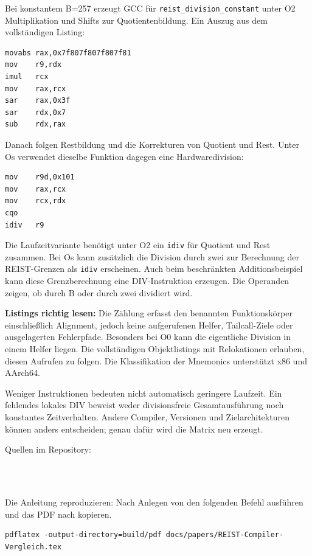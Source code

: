 \documentclass[11pt,a4paper]{article}
\begin{document}
Bei konstantem B=257 erzeugt GCC für \texttt{reist\_division\_constant} unter
O2 Multiplikation und Shifts zur Quotientenbildung. Ein Auszug aus dem
vollständigen Listing:
\begin{lstlisting}
movabs rax,0x7f807f807f807f81
mov    r9,rdx
imul   rcx
mov    rax,rcx
sar    rax,0x3f
sar    rdx,0x7
sub    rdx,rax
\end{lstlisting}
Danach folgen Restbildung und die Korrekturen von Quotient und Rest.
Unter Os verwendet dieselbe Funktion dagegen eine Hardwaredivision:
\begin{lstlisting}
mov    r9d,0x101
mov    rax,rcx
mov    rcx,rdx
cqo
idiv   r9
\end{lstlisting}
Die Laufzeitvariante benötigt unter O2 ein \texttt{idiv} für Quotient und Rest
zusammen. Bei Os kann zusätzlich die Division durch zwei zur Berechnung der
REIST-Grenzen als \texttt{idiv} erscheinen. Auch beim beschränkten
Additionsbeispiel kann diese Grenzberechnung eine DIV-Instruktion erzeugen.
Die Operanden zeigen, ob durch B oder durch zwei dividiert wird.

\textbf{Listings richtig lesen:}
Die Zählung erfasst den benannten Funktionskörper einschließlich Alignment,
jedoch keine aufgerufenen Helfer, Tailcall-Ziele oder ausgelagerten Fehlerpfade.
Besonders bei O0 kann die eigentliche Division in einem Helfer liegen.
Die vollständigen Objektlistings mit Relokationen erlauben, diesen Aufrufen
zu folgen. Die Klassifikation der Mnemonics unterstützt x86 und AArch64.

Weniger Instruktionen bedeuten nicht automatisch geringere Laufzeit. Ein
fehlendes lokales DIV beweist weder divisionsfreie Gesamtausführung noch
konstantes Zeitverhalten. Andere Compiler, Versionen und Zielarchitekturen
können anders entscheiden; genau dafür wird die Matrix neu erzeugt.

\small Quellen im Repository:\par
{}\\
\\
\par
Die Anleitung reproduzieren: Nach Anlegen von  den folgenden
Befehl ausführen und das PDF nach  kopieren.
\begin{lstlisting}[basicstyle=\ttfamily\footnotesize]
pdflatex -output-directory=build/pdf docs/papers/REIST-Compiler-Vergleich.tex
\end{lstlisting}
\newpage
\normalsize
\end{document}
